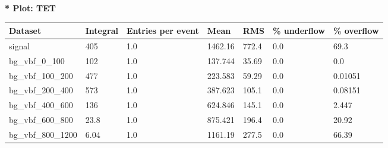 \documentclass[a4paper, 10pt]{article}
\begin{document}
\textbf{* Plot: TET}\\
   \begin{table}[H]
  \begin{center}
    \begin{tabular}{|m{23.0mm}|m{23.0mm}|m{18.0mm}|m{19.0mm}|m{19.0mm}|m{19.0mm}|m{19.0mm}|}
      \hline
      {\cellcolor{yellow}         Dataset}& {\cellcolor{yellow}         Integral}& {\cellcolor{yellow}         Entries per event}& {\cellcolor{yellow}         Mean}& {\cellcolor{yellow}         RMS}& {\cellcolor{yellow}         \% underflow}& {\cellcolor{yellow}         \% overflow}\\
      \hline
      {\cellcolor{white}         signal}& {\cellcolor{white}         405}& {\cellcolor{white}         1.0}& {\cellcolor{white}         1462.16}& {\cellcolor{white}         772.4}& {\cellcolor{red}         0.0}& {\cellcolor{red}         69.3}\\
      \hline
      {\cellcolor{white}         bg\_vbf\_0\_100}& {\cellcolor{white}         102}& {\cellcolor{white}         1.0}& {\cellcolor{white}         137.744}& {\cellcolor{white}         35.69}& {\cellcolor{green}         0.0}& {\cellcolor{green}         0.0}\\
      \hline
      {\cellcolor{white}         bg\_vbf\_100\_200}& {\cellcolor{white}         477}& {\cellcolor{white}         1.0}& {\cellcolor{white}         223.583}& {\cellcolor{white}         59.29}& {\cellcolor{green}         0.0}& {\cellcolor{green}         0.01051}\\
      \hline
      {\cellcolor{white}         bg\_vbf\_200\_400}& {\cellcolor{white}         573}& {\cellcolor{white}         1.0}& {\cellcolor{white}         387.623}& {\cellcolor{white}         105.1}& {\cellcolor{green}         0.0}& {\cellcolor{green}         0.08151}\\
      \hline
      {\cellcolor{white}         bg\_vbf\_400\_600}& {\cellcolor{white}         136}& {\cellcolor{white}         1.0}& {\cellcolor{white}         624.846}& {\cellcolor{white}         145.1}& {\cellcolor{green}         0.0}& {\cellcolor{green}         2.447}\\
      \hline
      {\cellcolor{white}         bg\_vbf\_600\_800}& {\cellcolor{white}         23.8}& {\cellcolor{white}         1.0}& {\cellcolor{white}         875.421}& {\cellcolor{white}         196.4}& {\cellcolor{red}         0.0}& {\cellcolor{red}         20.92}\\
      \hline
      {\cellcolor{white}         bg\_vbf\_800\_1200}& {\cellcolor{white}         6.04}& {\cellcolor{white}         1.0}& {\cellcolor{white}         1161.19}& {\cellcolor{white}         277.5}& {\cellcolor{red}         0.0}& {\cellcolor{red}         66.39}\\

\end{tabular}
\end{center}
\end{table}
\end{document}
